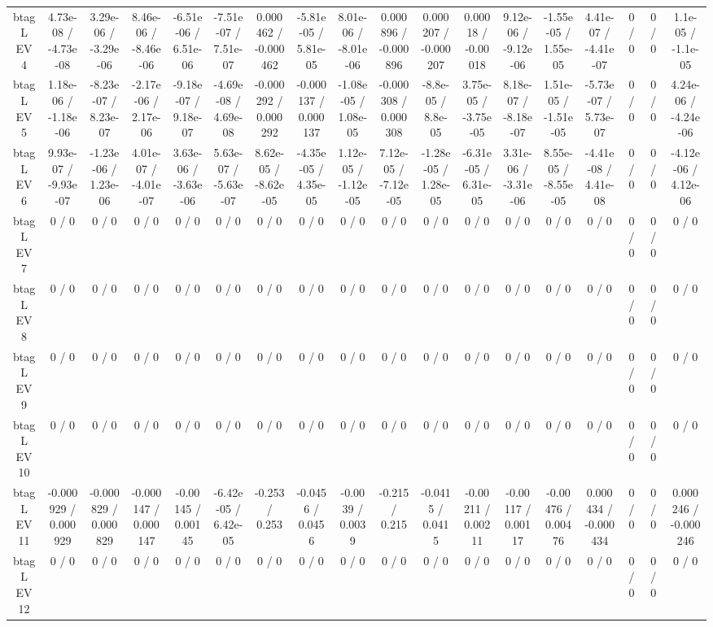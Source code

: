 \documentclass[10pt]{article}
\begin{document}
\begin{table}[htbp]
\begin{center}
\begin{tabular}{|c|c|c|c|c|c|c|c|c|c|c|c|c|c|c|c|c|c|}
  btag L EV 4 & 4.73e-08 / -4.73e-08 & 3.29e-06 / -3.29e-06 & 8.46e-06 / -8.46e-06 & -6.51e-06 / 6.51e-06 & -7.51e-07 / 7.51e-07 & 0.000462 / -0.000462 & -5.81e-05 / 5.81e-05 & 8.01e-06 / -8.01e-06 & 0.000896 / -0.000896 & 0.000207 / -0.000207 & 0.00018 / -0.00018 & 9.12e-06 / -9.12e-06 & -1.55e-05 / 1.55e-05 & 4.41e-07 / -4.41e-07 & 0 / 0 & 0 / 0 & 1.1e-05 / -1.1e-05 \\ 
  btag L EV 5 & 1.18e-06 / -1.18e-06 & -8.23e-07 / 8.23e-07 & -2.17e-06 / 2.17e-06 & -9.18e-07 / 9.18e-07 & -4.69e-08 / 4.69e-08 & -0.000292 / 0.000292 & -0.000137 / 0.000137 & -1.08e-05 / 1.08e-05 & -0.000308 / 0.000308 & -8.8e-05 / 8.8e-05 & 3.75e-05 / -3.75e-05 & 8.18e-07 / -8.18e-07 & 1.51e-05 / -1.51e-05 & -5.73e-07 / 5.73e-07 & 0 / 0 & 0 / 0 & 4.24e-06 / -4.24e-06 \\ 
  btag L EV 6 & 9.93e-07 / -9.93e-07 & -1.23e-06 / 1.23e-06 & 4.01e-07 / -4.01e-07 & 3.63e-06 / -3.63e-06 & 5.63e-07 / -5.63e-07 & 8.62e-05 / -8.62e-05 & -4.35e-05 / 4.35e-05 & 1.12e-05 / -1.12e-05 & 7.12e-05 / -7.12e-05 & -1.28e-05 / 1.28e-05 & -6.31e-05 / 6.31e-05 & 3.31e-06 / -3.31e-06 & 8.55e-05 / -8.55e-05 & -4.41e-08 / 4.41e-08 & 0 / 0 & 0 / 0 & -4.12e-06 / 4.12e-06 \\ 
  btag L EV 7 & 0 / 0 & 0 / 0 & 0 / 0 & 0 / 0 & 0 / 0 & 0 / 0 & 0 / 0 & 0 / 0 & 0 / 0 & 0 / 0 & 0 / 0 & 0 / 0 & 0 / 0 & 0 / 0 & 0 / 0 & 0 / 0 & 0 / 0 \\ 
  btag L EV 8 & 0 / 0 & 0 / 0 & 0 / 0 & 0 / 0 & 0 / 0 & 0 / 0 & 0 / 0 & 0 / 0 & 0 / 0 & 0 / 0 & 0 / 0 & 0 / 0 & 0 / 0 & 0 / 0 & 0 / 0 & 0 / 0 & 0 / 0 \\ 
  btag L EV 9 & 0 / 0 & 0 / 0 & 0 / 0 & 0 / 0 & 0 / 0 & 0 / 0 & 0 / 0 & 0 / 0 & 0 / 0 & 0 / 0 & 0 / 0 & 0 / 0 & 0 / 0 & 0 / 0 & 0 / 0 & 0 / 0 & 0 / 0 \\ 
  btag L EV 10 & 0 / 0 & 0 / 0 & 0 / 0 & 0 / 0 & 0 / 0 & 0 / 0 & 0 / 0 & 0 / 0 & 0 / 0 & 0 / 0 & 0 / 0 & 0 / 0 & 0 / 0 & 0 / 0 & 0 / 0 & 0 / 0 & 0 / 0 \\ 
  btag L EV 11 & -0.000929 / 0.000929 & -0.000829 / 0.000829 & -0.000147 / 0.000147 & -0.00145 / 0.00145 & -6.42e-05 / 6.42e-05 & -0.253 / 0.253 & -0.0456 / 0.0456 & -0.0039 / 0.0039 & -0.215 / 0.215 & -0.0415 / 0.0415 & -0.00211 / 0.00211 & -0.00117 / 0.00117 & -0.00476 / 0.00476 & 0.000434 / -0.000434 & 0 / 0 & 0 / 0 & 0.000246 / -0.000246 \\ 
  btag L EV 12 & 0 / 0 & 0 / 0 & 0 / 0 & 0 / 0 & 0 / 0 & 0 / 0 & 0 / 0 & 0 / 0 & 0 / 0 & 0 / 0 & 0 / 0 & 0 / 0 & 0 / 0 & 0 / 0 & 0 / 0 & 0 / 0 & 0 / 0 \\ 

\end{tabular}
\end{center}
\end{table}
\end{document}
